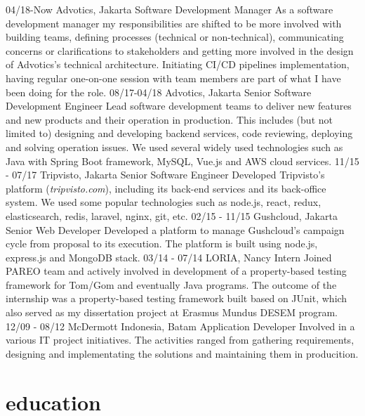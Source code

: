 \documentclass[]{friggeri-cv}
\begin{document}
\begin{entrylist}
  \entry
    {04/18-Now}
    {Advotics, Jakarta}
    {Software Development Manager}
    {As a software development manager my responsibilities are shifted to be more involved with building teams,
	defining processes (technical or non-technical), communicating concerns or clarifications to stakeholders
	and getting more involved in the design of Advotics's technical architecture. Initiating CI/CD pipelines implementation,
	having regular one-on-one session with team members are part of what I have been doing for the role.}
  \entry
    {08/17-04/18}
    {Advotics, Jakarta}
    {Senior Software Development Engineer}
    {Lead software development teams to deliver new features and new products and their operation in production.
	This includes (but not limited to) designing and developing backend services, code reviewing, deploying and solving operation issues.
	We used several widely used technologies such as Java with Spring Boot framework, MySQL, Vue.js and AWS cloud services.}
  \entry
    {11/15 - 07/17}
    {Tripvisto, Jakarta}
    {Senior Software Engineer}
	{Developed Tripvisto's platform (\emph{tripvisto.com}), including its back-end services and its back-office system.
	We used some popular technologies such as node.js, react, redux, elasticsearch, redis, laravel, nginx, git, etc.}
  \entry
	{02/15 - 11/15}
	{Gushcloud, Jakarta}
	{Senior Web Developer}
	{Developed a platform to manage Gushcloud's campaign cycle from proposal to its execution. The platform
	is built using node.js, express.js and MongoDB stack.}
  \entry
	{03/14 - 07/14}
	{LORIA, Nancy}
	{Intern}
	{Joined PAREO team and actively involved in development of a property-based testing framework for Tom/Gom
	and eventually Java programs. The outcome of the internship was a property-based testing framework built based
	on JUnit, which also served as my dissertation project at Erasmus Mundus DESEM program.}
  \entry
	{12/09 - 08/12}
	{McDermott Indonesia, Batam}
	{Application Developer}
	{Involved in a various IT project initiatives. The activities ranged from gathering requirements, designing and implementating the solutions
	and maintaining them in producition.}
\end{entrylist}

\section{education}
\end{document}
